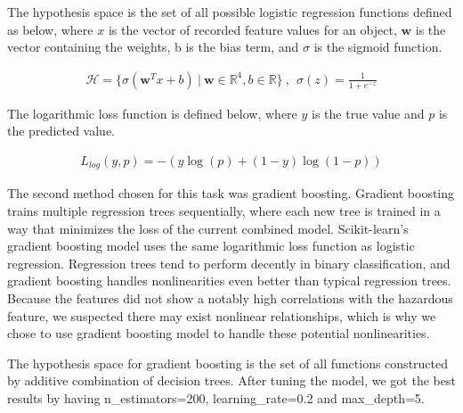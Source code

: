 \documentclass{article}
\begin{document}
The hypothesis space is the set of all possible logistic regression functions defined as below, where $x$ is the vector of recorded feature values for an object, $\mathbf{w}$ is the vector containing the weights, b is the bias term, and $\sigma$ is the sigmoid function.

\begin{align*}
    \mathcal{H} = \{\sigma(\mathbf{w}^Tx + b) \ | \ \mathbf{w}\in \mathbb{R}^4, b\in\mathbb{R} \} \ , \ \ \sigma(z) = \frac{1}{1+e^{-z}}
\end{align*}



The logarithmic loss function is defined below, where $y$ is the true value and $p$ is the predicted value. %

\begin{align*}
    L_{log}(y,p) = -\left(y \log (p) + (1-y) \log (1-p)\right)
\end{align*}



The second method chosen for this task was gradient boosting. Gradient boosting trains multiple regression trees sequentially, where each new tree is trained in a way that minimizes the loss of the current combined model. Scikit-learn’s gradient boosting model uses the same logarithmic loss function as logistic regression. Regression trees tend to perform decently in binary classification, and gradient boosting handles nonlinearities even better than typical regression trees. Because the features did not show a notably high correlations with the hazardous feature, we suspected there may exist nonlinear relationships, which is why we chose to use gradient boosting model to handle these potential nonlinearities.


\vspace{1em}

The hypothesis space for gradient boosting is the set of all functions constructed by additive combination of decision trees. After tuning the model, we got the best results by having n\_estimators=200, learning\_rate=0.2 and max\_depth=5.







\end{document}
